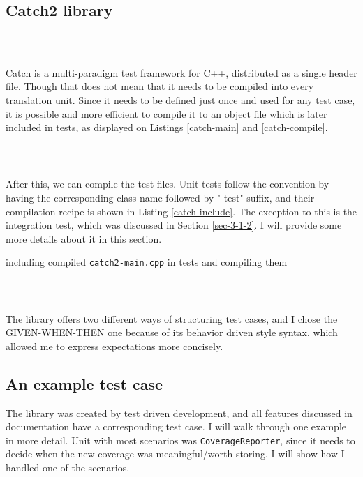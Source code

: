\documentclass{elteikthesis}[2018/06/06]
\newcommand*{\code}{\lstinline[keywordstyle=\color{violet}, basicstyle=\color{violet}]}
\renewcommand{\footnote}{\endnote}
\begin{document}
\subsection{Catch2 library}
\label{sec-3-3-1}
\begin{listing}
\caption{\label{catch-main}contents of \code{test/catch2-main.cpp} defining the main function for test framework}
\inputminted{c++}{test/catch2-main.cpp} \\
\end{listing}

Catch is a multi-paradigm test framework for C++, distributed as a single header file. Though that does not mean that it needs to be compiled into every translation unit.  Since it needs to be defined just once and used for any test case, it is possible and more efficient\footnote{DEFINITION NOT FOUND.} to compile it to an object file which is later included in tests, as displayed on Listings \ref{catch-main} and \ref{catch-compile}. \\

\begin{listing}
\caption{\label{catch-compile}compiling contents of \code{test/catch-main.cpp}}
\inputminted[firstline=70,lastline=75]{bash}{Makefile} \\
\end{listing}

After this, we can compile the test files. Unit tests follow the convention by having the corresponding class name followed by "-test" suffix, and their compilation recipe is shown in Listing \ref{catch-include}. The exception to this is the integration test, which was discussed in Section \ref{sec-3-1-2}. I will provide some more details about it in this section. \\

\begin{listing}
\caption{\label{catch-include}including compiled \code{catch2-main.cpp} in tests and compiling them}
\inputminted[firstline=77,lastline=91,breaklines]{bash}{Makefile} \\
\end{listing}

The library offers two different ways of structuring test cases, and I chose the GIVEN-WHEN-THEN one because of its behavior driven style syntax, which allowed me to express expectations more concisely. \\

\subsection{An example test case}
\label{sec-3-3-2}
The library was created by test driven development, and all features discussed in documentation have a corresponding test case. I will walk through one example in more detail. Unit with most scenarios was \code{CoverageReporter}, since it needs to decide when the new coverage was meaningful/worth storing. I will show how I handled one of the scenarios. \\
\end{document}
